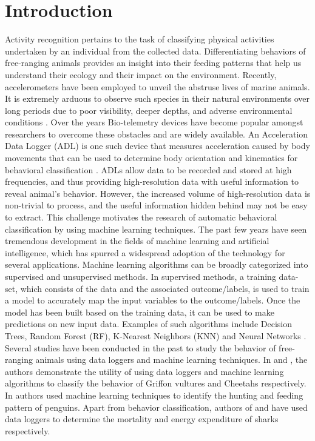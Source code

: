 \documentclass[conference]{IEEEtran}
\begin{document}
\section{Introduction}
Activity recognition pertains to the task of classifying physical activities undertaken by an individual from the collected data. Differentiating behaviors of free-ranging animals provides an insight into their feeding patterns that help us understand their ecology and their impact on the environment. Recently, accelerometers have been employed to unveil the abstruse lives of marine animals.   It is extremely arduous to observe such species in their natural environments over long periods due to poor visibility, deeper depths, and adverse environmental conditions \cite{1}. Over the years Bio-telemetry devices have become popular amongst researchers to overcome these obstacles and are widely available. An Acceleration Data Logger (ADL) is one such device that measures acceleration caused by body movements that can be used to determine body orientation and kinematics for behavioral classification \cite{1}. ADLs allow data to be recorded and stored at high frequencies, and thus providing high-resolution data with useful information to reveal animal’s behavior. However, the increased   volume of high-resolution data is non-trivial to process, and the useful information hidden behind may not be easy to extract. This challenge motivates the research of automatic behavioral classification by using machine learning techniques. 
The past few years have seen tremendous development in the fields of machine learning and artificial intelligence, which has spurred a widespread adoption of the technology for several applications. Machine learning algorithms can be broadly categorized into supervised and unsupervised methods. In supervised methods, a training data-set, which consists of the data and the associated outcome/labels, is used to train a model to accurately map the input variables to the outcome/labels. Once the model has been built based on the training data, it can be used to make predictions on new input data. Examples of such algorithms include Decision Trees, Random Forest (RF), K-Nearest Neighbors (KNN) and Neural Networks \cite{1}. 
Several studies have been conducted in the past to study the behavior of free-ranging animals using data loggers and machine learning techniques. In  \cite{2} and  \cite{3}, the authors demonstrate the utility of using data loggers and machine learning algorithms to classify the behavior of Griffon vultures and Cheetahs respectively. In  \cite{4} authors used machine learning techniques to identify the hunting and feeding pattern of penguins. Apart from behavior classification, authors of  \cite{5} and  \cite{6} have used data loggers to determine the mortality and energy expenditure of sharks respectively.
\end{document}
